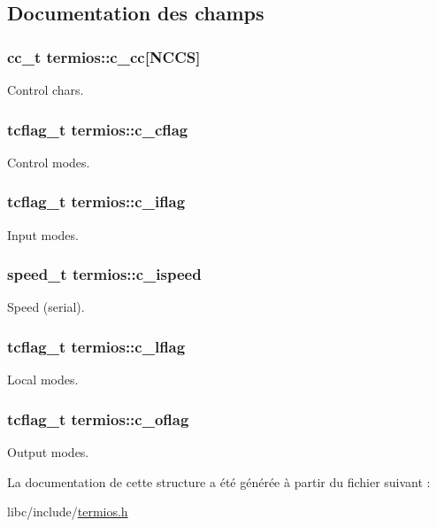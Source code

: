 \subsection{\-Documentation des champs}
\hypertarget{structtermios_a5fbe3e4316082afab45fc424938ef13a}{
\subsubsection[{c\-\_\-cc}]{\setlength{\rightskip}{0pt plus 5cm}cc\-\_\-t {\bf termios\-::c\-\_\-cc}\mbox{[}\-N\-C\-C\-S\mbox{]}}}\label{structtermios_a5fbe3e4316082afab45fc424938ef13a}
\-Control chars. \hypertarget{structtermios_a5d42b95faa4745c3bea53652d2812162}{
\subsubsection[{c\-\_\-cflag}]{\setlength{\rightskip}{0pt plus 5cm}tcflag\-\_\-t {\bf termios\-::c\-\_\-cflag}}}\label{structtermios_a5d42b95faa4745c3bea53652d2812162}
\-Control modes. \hypertarget{structtermios_a85b6c86d2a3db45a3829488190e357e4}{
\subsubsection[{c\-\_\-iflag}]{\setlength{\rightskip}{0pt plus 5cm}tcflag\-\_\-t {\bf termios\-::c\-\_\-iflag}}}\label{structtermios_a85b6c86d2a3db45a3829488190e357e4}
\-Input modes. \hypertarget{structtermios_a02ae972cbc9fb2cf4a1aa6a6751a421a}{
\subsubsection[{c\-\_\-ispeed}]{\setlength{\rightskip}{0pt plus 5cm}speed\-\_\-t {\bf termios\-::c\-\_\-ispeed}}}\label{structtermios_a02ae972cbc9fb2cf4a1aa6a6751a421a}
\-Speed (serial). \hypertarget{structtermios_a91bdd7691180800fccc4b791466ee9c3}{
\subsubsection[{c\-\_\-lflag}]{\setlength{\rightskip}{0pt plus 5cm}tcflag\-\_\-t {\bf termios\-::c\-\_\-lflag}}}\label{structtermios_a91bdd7691180800fccc4b791466ee9c3}
\-Local modes. \hypertarget{structtermios_ad6e2cfedb81530e5a6a3a0e30b8c6362}{
\subsubsection[{c\-\_\-oflag}]{\setlength{\rightskip}{0pt plus 5cm}tcflag\-\_\-t {\bf termios\-::c\-\_\-oflag}}}\label{structtermios_ad6e2cfedb81530e5a6a3a0e30b8c6362}
\-Output modes. 

\-La documentation de cette structure a été générée à partir du fichier suivant \-:\begin{DoxyCompactItemize}
\item 
libc/include/\hyperlink{termios_8h}{termios.\-h}\end{DoxyCompactItemize}
